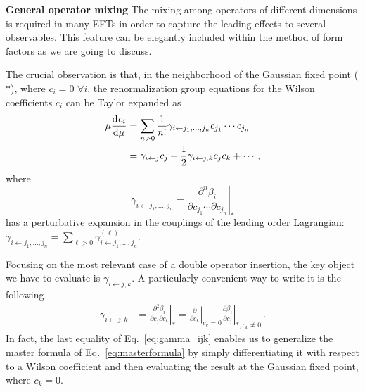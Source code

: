 \documentclass[prl,twocolumn,twoside,preprintnumbers,superscriptaddress, nofootinbib]{revtex4-2}
\begin{document}
%

{\bf General operator mixing}
The mixing among operators of different dimensions is required in many EFTs in order to capture the leading effects to several observables. 
This feature can be elegantly included within the method of form factors as we are going to discuss.

The crucial observation is that, in the neighborhood of the Gaussian 
fixed point ($*$), where $c_i=0$ $\forall i$, the renormalization group equations for the Wilson coefficients $c_i$ can be Taylor expanded as
%
\begin{equation}
\begin{split}
    \mu\dv[]{c_i}{\mu} &= \sum_{n> 0}
    \frac{1}{n!}\gamma_{i\leftarrow j_1,\dotsc,j_n}c_{j_1}\dotsm c_{j_n}\\
    &=
    \gamma_{i\leftarrow j}c_j +
    \frac{1}{2}\gamma_{i\leftarrow j,k}c_jc_k + \dotsb\,,
\end{split}
\end{equation}
%
where 
%
\begin{equation}
    \gamma_{i\leftarrow j_1, \dotsc, j_n} = \left.\frac{\partial^n \beta_i}{\partial c_{j_1}\dotsm \partial c_{j_n}}\right |_{*}
\end{equation}
%
has a perturbative expansion in the couplings of the leading order Lagrangian: $\gamma_{i\leftarrow j_1, \dotsc, j_n}= \sum_{\ell > 0}\gamma_{i\leftarrow j_1, \dotsc, j_n}^{(\ell)}$.

Focusing on the most relevant case of a double operator insertion, 
the key object we have to evaluate is $\gamma_{i\leftarrow j,k}$. 
A particularly convenient way to write it is the following
%
\begin{align}
    \gamma_{i\leftarrow j,k}&=\left. \frac{\partial^2 \beta_i}{\partial c_j \partial c_k}\right|_{*} = \left.\frac{\partial}{\partial c_k}\right|_{c_k=0} \!\!\left.\frac{\partial \beta_i}{\partial c_j}\right|_{*,c_k\neq 0} \,.
    \label{eq:gamma_ijk}
\end{align}
%
In fact, the last equality of Eq.~\eqref{eq:gamma_ijk}
enables us to generalize the master formula of Eq.~\eqref{eq:masterformula} by simply differentiating it with respect to a Wilson coefficient and then evaluating the result at the Gaussian fixed point, where $c_k = 0$.
\end{document}
